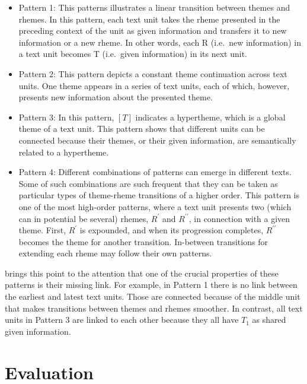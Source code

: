 \begin{itemize}
\item Pattern 1: This patterns illustrates a linear transition between themes and rhemes. 
In this pattern, each text unit takes the rheme presented in the preceding context of the unit as given information and transfers it to new information or a new rheme. 
In other words, each R (i.e.\ new information) in a text unit becomes T (i.e.\ given information) in its next unit.  


\item Pattern 2: 
This pattern depicts a constant theme continuation across text units.  
One theme appears in a series of text units, each of which, however, presents new information about the presented theme. 


\item Pattern 3: 
In this pattern, $[T]$ indicates a hypertheme, which is a global theme of a text unit.  
This pattern shows that different units can be connected because their themes, or their given information, are semantically related to a hypertheme. 

\item Pattern 4: 
Different combinations of patterns can emerge in different texts. 
Some of such combinations are such frequent that they can be taken as particular types of theme-rheme transitions of a higher order. 
This pattern is one of the most high-order patterns, where a text unit presents two (which can in potential be several) rhemes, $R^\prime$ and $R^{\prime\prime}$, in connection with a given theme. 
First, $R^{\prime}$ is expounded, and when its progression completes, $R^{\prime\prime}$ becomes the theme for another transition. 
 In-between transitions for extending each rheme may follow their own patterns. 
\end{itemize}

 brings this point to the attention that one of the crucial properties of these patterns is their missing link.   
For example, in Pattern 1 there is no link between the earliest and latest text units. 
Those are connected because of the middle unit that makes transitions between themes and rhemes smoother. 
In contrast, all text units in Pattern 3  are linked to each other because they all have $T_1$ as shared given information. 

\section{Evaluation}
\label{sec:coh-eval}

